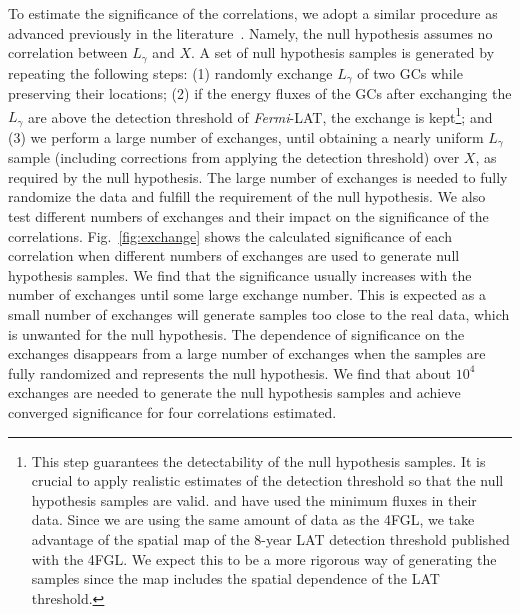\documentclass[doublespace,nopageskip]{VTthesis} %
\begin{document}
To estimate the significance of the correlations, we adopt a similar procedure as advanced previously in the literature~\citep{2012ApJ...755..164A}. Namely, the null hypothesis assumes no correlation between $L_\gamma$ and $X$. A set of null hypothesis samples is generated by repeating the following steps: (1) randomly exchange $L_\gamma$ of two GCs while preserving their locations; (2) if the energy fluxes of the GCs after exchanging the $L_\gamma$ are above the detection threshold of \textit{Fermi}-LAT, the exchange is kept\footnote{This step guarantees the detectability of the null hypothesis samples. It is crucial to apply realistic estimates of the detection threshold so that the null hypothesis samples are valid. \citet{2012ApJ...755..164A} and \citet{2020ApJ...894...88A} have used the minimum fluxes in their data. Since we are using the same amount of data as the 4FGL, we take advantage of the spatial map of the 8-year LAT detection threshold published with the 4FGL. We expect this to be a more rigorous way of generating the samples since the map includes the spatial dependence of the LAT threshold.}; and (3) we perform a large number of exchanges, until obtaining a nearly uniform $L_\gamma$ sample (including corrections from applying the detection threshold) over $X$, as required by the null hypothesis. 
The large number of exchanges is needed to fully randomize the data and fulfill the requirement of the null hypothesis. We also test different numbers of exchanges and their impact on the significance of the correlations. Fig.~\ref{fig:exchange} shows the calculated significance of each correlation when different numbers of exchanges are used to generate null hypothesis samples. We find that the significance usually increases with the number of exchanges until some large exchange number. This is expected as a small number of exchanges will generate samples too close to the real data, which is unwanted for the null hypothesis. The dependence of significance on the exchanges disappears from a large number of exchanges when the samples are fully randomized and represents the null hypothesis. We find that about $10^4$ exchanges are needed to generate the null hypothesis samples and achieve converged significance for four correlations estimated.
\end{document}
